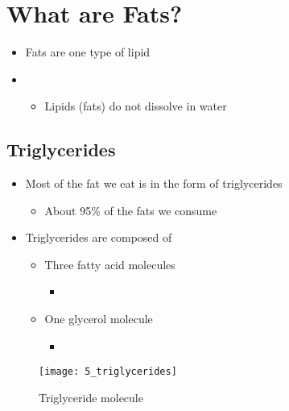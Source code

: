 \documentclass[title={Chapter 5}]{fdsn201notes}
\begin{document}

\section{What are Fats?}\label{sec:what-are-fats?}
\begin{itemize}
	\item Fats are one type of lipid
	\item {}
	\begin{itemize}
		\item Lipids (fats) do not dissolve in water
	\end{itemize}
\end{itemize}

\subsection{Triglycerides}\label{subsec:triglycerides}
\begin{itemize}
	\item Most of the fat we eat is in the form of triglycerides
	\begin{itemize}
		\item About 95\% of the fats we consume
	\end{itemize}
	\item Triglycerides are composed of
	\begin{itemize}
		\item Three fatty acid molecules
		\begin{itemize}
			\item {}
		\end{itemize}
		\item One glycerol molecule
		\begin{itemize}
			\item {}
		\end{itemize}
	\end{itemize}
\end{itemize}

\begin{figure}[H]
	\centering
	\texttt{[image: 5\_triglycerides]}
	\caption{Triglyceride molecule}
	\label{fig:triglyceride}
\end{figure}
\end{document}
